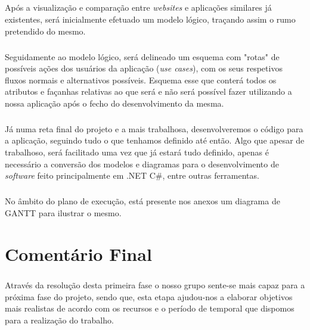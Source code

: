 \documentclass[a4paper,12pt]{scrreprt}
\begin{document}
        \paragraph{}
        Após a visualização e comparação entre \textit{websites} e aplicações similares já existentes, será inicialmente efetuado um modelo lógico, traçando assim o rumo pretendido do mesmo.
        \paragraph{}
        Seguidamente ao modelo lógico, será delineado um esquema com "rotas" de possíveis ações dos usuários da aplicação (\textit{use cases}), com os seus respetivos fluxos normais e alternativos possíveis. Esquema esse que conterá todos os atributos e façanhas relativas ao que será e não será possível fazer utilizando a nossa aplicação após o fecho do desenvolvimento da mesma.
        \paragraph{}
        Já numa reta final do projeto e a mais trabalhosa, desenvolveremos o código para a aplicação, seguindo tudo o que tenhamos definido até então. Algo que apesar de trabalhoso, será facilitado uma vez que já estará tudo definido, apenas é necessário a conversão dos modelos e diagramas para o desenvolvimento de \textit{software} feito principalmente em .NET C\#, entre outras ferramentas.
        \paragraph{}
        No âmbito do plano de execução, está presente nos anexos um diagrama de GANTT para ilustrar o mesmo.


\chapter{Comentário Final}
    \paragraph{}
    Através da resolução desta primeira fase o nosso grupo sente-se mais capaz para a próxima fase do projeto, sendo que, esta etapa ajudou-nos a elaborar objetivos mais realistas de acordo com os recursos e o período de temporal que dispomos para a realização do trabalho.
\end{document}
